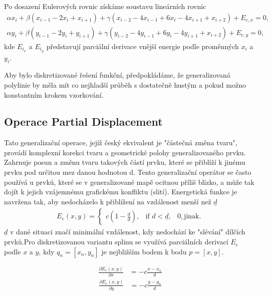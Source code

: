 \documentclass[a4paper,12pt]{article}
\begin{document}
    Po dosazení Eulerových rovnic získáme soustavu lineárních rovnic
    \begin{align*}
    \alpha x_i + \beta (x_{i-1} - 2x_i + x_{i+1}) + \gamma (x_{i-2} - 4x_{i-1} + 6x_i - 4x_{i+1} + x_{i+2}) + E_{e,x} = 0,
    \end{align*}
    \begin{align*}
    \alpha y_i + \beta (y_{i-1} - 2y_i + y_{i+1}) + \gamma (y_{i-2} - 4y_{i-1} + 6y_i - 4y_{i+1} + x_{i+2}) + E_{e,y} = 0,
    \end{align*}
    kde $E_i_x$ a $E_i_y$ představují parciální derivace vnější energie podle proměnných $x_i$ a $y_i$.
    
    Aby bylo diskretizované řešení funkční, předpokládáme, že generalizovaná polylinie by měla mít co nejhladší průběh s dostatečně hustým a pokud možno konstantním krokem vzorkování.

    \subsection{Operace Partial Displacement}
    
    Tato generalizační operace, jejíž český ekvivalent je "částečná změna tvaru", provádí komplexní korekci tvaru a geometrické polohy generalizovaného prvku. Zahrnuje posun a změnu tvaru takových částí prvku, které se přiblíží k jinému prvku pod určitou mez danou hodnotou d. Tento generalizační operátor se často používá u prvků, které se v generalizované mapě ocitnou příliš blízko, a může tak dojít k jejich vzájemnému grafickému konfliktu (slití).
    Energetická funkce je navržena tak, aby nedocházelo k přiblížení na vzdálenost menší než $\underline{d}$
    \begin{align*}
    E_{e}(x, y) =
    \begin{cases}
    c(1 - \frac{d}{\underline{d}}), & \text{if } d < \underline{d}, 
    & 0, \text{jinak}.
    \end{cases}
    \end{align*}
     $\underline{d}$ v dané situaci značí minimální vzdálenost, kdy nedochází ke "slévání" dílčích prvků.Pro diskretizovanou variantu splinu se využívá parciálních derivací $E_e$ podle $x$ a $y$, kdy $q_n = [x_n, y_n]$ je nejbližším bodem k bodu $p = [x, y]$.
    
    \begin{align*}
    \frac{\partial E_e(x, y)}{\partial x} &= -c\frac{x - x_n}{d}
    \end{align*}
    \begin{align*}
    \frac{\partial E_e(x, y)}{\partial y} &= -c\frac{y - y_n}{d}
    \end{align*}
\end{document}
